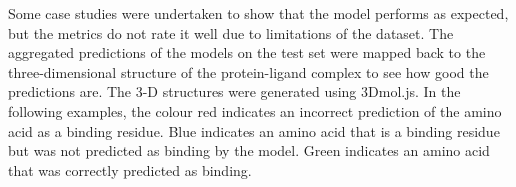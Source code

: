 \documentclass[journal=jacsat,manuscript=article]{achemso}
\begin{document}







\quad Some case studies were undertaken to show that the model performs as expected, but the metrics do not rate it well due to limitations of the dataset. The aggregated predictions of the models on the test set were mapped back to the three-dimensional structure of the protein-ligand complex to see how good the predictions are. The 3-D structures were generated using 3Dmol.js\cite{rego20153dmol}. In the following examples, the colour red indicates an incorrect prediction of the amino acid as a binding residue. Blue indicates an amino acid that is a binding residue but was not predicted as binding by the model. Green indicates an amino acid that was correctly predicted as binding.
\end{document}
